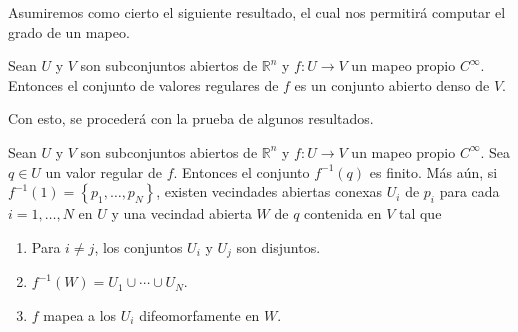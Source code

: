 \documentclass[12pt]{report}
\theoremstyle{largebreak}
\newcommand\cf[3]{\ensuremath{#1:#2\rightarrow#3}}
\begin{document}
Asumiremos como cierto el siguiente resultado, el cual nos permitirá computar el grado de un mapeo.

\setcounter{section}{6}
\setcounter{theor}{1}

\begin{theor}[Sard]
    Sean $U$ y $V$ son subconjuntos abiertos de $\mathbb{R}^n$ y $\cf{f}{U}{V}$ un mapeo propio $C^\infty$. Entonces el conjunto de valores regulares de $f$ es un conjunto abierto denso de $V$.
\end{theor}

Con esto, se procederá con la prueba de algunos resultados.

\begin{theor}
    Sean $U$ y $V$ son subconjuntos abiertos de $\mathbb{R}^n$ y $\cf{f}{U}{V}$ un mapeo propio $C^\infty$. Sea $q\in U$ un valor regular de $f$. Entonces el conjunto $f^{-1}(q)$ es finito. Más aún, si $f^{-1}(1)=\left\{p_1,\dots,p_N\right\}$, existen vecindades abiertas conexas $U_i$ de $p_i$ para cada $i=1,\dots,N$ en $U$ y una vecindad abierta $W$ de $q$ contenida en $V$ tal que
    \begin{enumerate}
        \item Para $i\neq j$, los conjuntos $U_i$ y $U_j$ son disjuntos.
        \item $f^{-1}(W)=U_1\cup\cdots\cup U_N$.
        \item $f$ mapea a los $U_i$ difeomorfamente en $W$. 
    \end{enumerate}
\end{theor}
\end{document}
